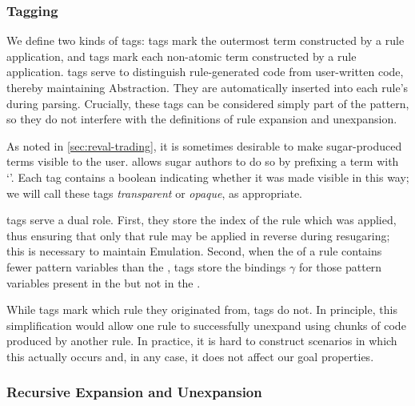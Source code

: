 \subsubsection{Tagging}
\label{sec:reval-tagging}

We define two kinds of tags: {\MacHeadf} tags mark the outermost term
constructed by a rule application, and {\MacBodyf} tags mark each
non-atomic term constructed by a rule application. {\MacBodyf} tags serve
to distinguish rule-generated code from user-written code, thereby
maintaining Abstraction. They are automatically inserted into each rule's
 during parsing. Crucially, these tags can be considered simply part
of the  pattern, so they do not interfere with the definitions of
rule expansion and unexpansion. 

As noted in
\cref{sec:reval-trading}, it is sometimes desirable to make sugar-produced
terms visible to the user. {\Resugarer} allows sugar authors to do so by
prefixing a term with `\Code{!}'. Each {\MacBodyf} tag contains a boolean
indicating whether it was made visible in this way; we will call these tags
\emph{transparent} or \emph{opaque}, as appropriate.

{\MacHeadf} tags serve a dual role. First, they store the index of the
rule which was applied, thus ensuring that only that rule may be applied
in reverse during resugaring; this is necessary to maintain
Emulation. Second, when the  of a rule contains fewer pattern variables than
the , {\MacHeadf} tags store the bindings $\gamma$ for those
pattern variables present in the  but not in the .

While {\MacHeadf} tags mark which rule they originated from, {\MacBodyf}
tags do not. In principle, this
simplification would allow one rule to successfully unexpand using chunks
of code produced by another rule. In practice, it is hard to construct
scenarios in which this actually occurs and, in any case, it does not
affect our goal properties.

\subsubsection{Recursive Expansion and Unexpansion}
\label{sec:reval-expansion}

